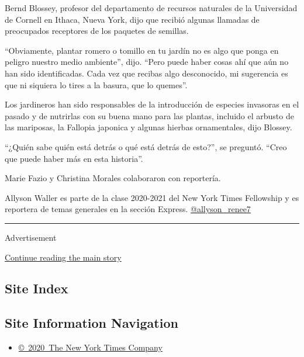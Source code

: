 Bernd Blossey, profesor del departamento de recursos naturales de la
Universidad de Cornell en Ithaca, Nueva York, dijo que recibió algunas
llamadas de preocupados receptores de los paquetes de semillas.

``Obviamente, plantar romero o tomillo en tu jardín no es algo que ponga
en peligro nuestro medio ambiente'', dijo. ``Pero puede haber cosas ahí
que aún no han sido identificadas. Cada vez que recibas algo
desconocido, mi sugerencia es que ni siquiera lo tires a la basura, que
lo quemes''.

Los jardineros han sido responsables de la introducción de especies
invasoras en el pasado y de nutrirlas con su buena mano para las
plantas, incluido el arbusto de las mariposas, la Fallopia japonica y
algunas hierbas ornamentales, dijo Blossey.

``¿Quién sabe quién está detrás o qué está detrás de esto?'', se
preguntó. ``Creo que puede haber más en esta historia''.

Marie Fazio y Christina Morales colaboraron con reportería.

Allyson Waller es parte de la clase 2020-2021 del New York Times
Fellowship y es reportera de temas generales en la sección Express.
\href{https://twitter.com/allyson_renee7}{@allyson\_renee7}

\begin{center}\rule{0.5\linewidth}{\linethickness}\end{center}

Advertisement

\protect\hyperlink{after-bottom}{Continue reading the main story}

\hypertarget{site-index}{%
\subsection{Site Index}\label{site-index}}

\hypertarget{site-information-navigation}{%
\subsection{Site Information
Navigation}\label{site-information-navigation}}

\begin{itemize}
\tightlist
\item
  \href{https://help.nytimes3xbfgragh.onion/hc/en-us/articles/115014792127-Copyright-notice}{©~2020~The
  New York Times Company}
\end{itemize}

